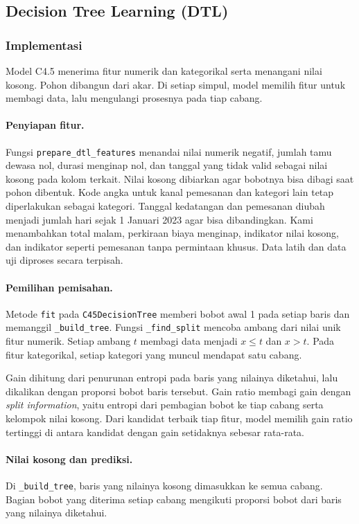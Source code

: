 \subsection{Decision Tree Learning (DTL)}

\subsubsection{Implementasi}
Model C4.5 menerima fitur numerik dan kategorikal serta menangani nilai kosong. Pohon dibangun dari akar. Di setiap simpul, model memilih fitur untuk membagi data, lalu mengulangi prosesnya pada tiap cabang.

\paragraph{Penyiapan fitur.}
Fungsi \texttt{prepare\_dtl\_features} menandai nilai numerik negatif, jumlah tamu dewasa nol, durasi menginap nol, dan tanggal yang tidak valid sebagai nilai kosong pada kolom terkait. Nilai kosong dibiarkan agar bobotnya bisa dibagi saat pohon dibentuk. Kode angka untuk kanal pemesanan dan kategori lain tetap diperlakukan sebagai kategori.
Tanggal kedatangan dan pemesanan diubah menjadi jumlah hari sejak 1 Januari 2023 agar bisa dibandingkan. Kami menambahkan total malam, perkiraan biaya menginap, indikator nilai kosong, dan indikator seperti pemesanan tanpa permintaan khusus. Data latih dan data uji diproses secara terpisah.

\paragraph{Pemilihan pemisahan.}
Metode \texttt{fit} pada \texttt{C45DecisionTree} memberi bobot awal 1 pada setiap baris dan memanggil \texttt{\_build\_tree}. Fungsi \texttt{\_find\_split} mencoba ambang dari nilai unik fitur numerik. Setiap ambang $t$ membagi data menjadi $x\leq t$ dan $x>t$. Pada fitur kategorikal, setiap kategori yang muncul mendapat satu cabang.

Gain dihitung dari penurunan entropi pada baris yang nilainya diketahui, lalu dikalikan dengan proporsi bobot baris tersebut. Gain ratio membagi gain dengan \textit{split information}, yaitu entropi dari pembagian bobot ke tiap cabang serta kelompok nilai kosong. Dari kandidat terbaik tiap fitur, model memilih gain ratio tertinggi di antara kandidat dengan gain setidaknya sebesar rata-rata.

\paragraph{Nilai kosong dan prediksi.}
Di \texttt{\_build\_tree}, baris yang nilainya kosong dimasukkan ke semua cabang. Bagian bobot yang diterima setiap cabang mengikuti proporsi bobot dari baris yang nilainya diketahui.

